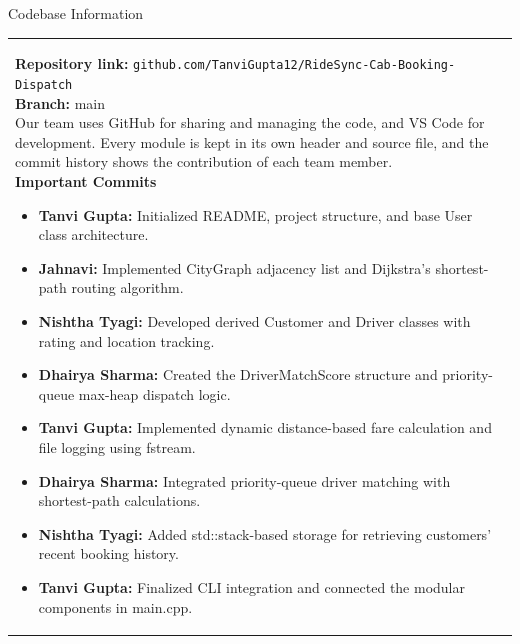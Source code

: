 \documentclass[12pt,a4paper]{article}
\newcommand{\sectiontitle}[1]{%
    {\color{GEUBlue}
    \fontsize{18}{22}\selectfont #1}
}
\newcommand{\answerbox}[2]{%
    \begin{tabularx}{\textwidth}{
        |>{\RaggedRight\arraybackslash}X|}
        \hline
        \parbox[t][#1][t]{\dimexpr\linewidth-12pt\relax}{
            \vspace{5pt}
            \fontsize{11}{13}\selectfont #2
        }\\
        \hline
    \end{tabularx}
}
\begin{document}
\newpage


\vspace*{0.20cm}

\vspace*{0.20cm}
\sectiontitle{Codebase Information}
\vspace{0.05cm}
\vspace{0.20cm}

\answerbox{9.0cm}{
\textbf{Repository link:} \texttt{github.com/TanviGupta12/RideSync-Cab-Booking-Dispatch}\\[3pt]
\textbf{Branch:} main\\[5pt]

Our team uses GitHub for sharing and managing the code, and VS Code for development. Every module is kept in its own header and source file, and the commit history shows the contribution of each team member.\\[5pt]

\textbf{Important Commits}
\vspace{-3pt}

\begin{itemize}
    \setlength{\itemsep}{2pt}
    \setlength{\parskip}{0pt}
    \setlength{\topsep}{2pt}
    \setlength{\leftmargin}{15pt}
    \small

    \item \textbf{Tanvi Gupta:} Initialized README, project structure, and base User class architecture.

    \item \textbf{Jahnavi:} Implemented CityGraph adjacency list and Dijkstra's shortest-path routing algorithm.

    \item \textbf{Nishtha Tyagi:} Developed derived Customer and Driver classes with rating and location tracking.

    \item \textbf{Dhairya Sharma:} Created the DriverMatchScore structure and priority-queue max-heap dispatch logic.

    \item \textbf{Tanvi Gupta:} Implemented dynamic distance-based fare calculation and file logging using fstream.

    \item \textbf{Dhairya Sharma:} Integrated priority-queue driver matching with shortest-path calculations.

    \item \textbf{Nishtha Tyagi:} Added std::stack-based storage for retrieving customers' recent booking history.

    \item \textbf{Tanvi Gupta:} Finalized CLI integration and connected the modular components in main.cpp.
\end{itemize}
}
\end{document}
